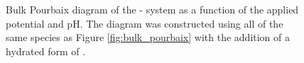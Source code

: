 \begin{figure}[!htb]
\centering
{}
\caption{\label{fig:bulk_pourbaix_w_irho3}
%
Bulk Pourbaix diagram of the - system as a function of the applied potential and pH.
%
The diagram was constructed using all of the same species as Figure \ref{fig:bulk_pourbaix} with the addition of a hydrated form of \aIrOthree.
}
\end{figure}







